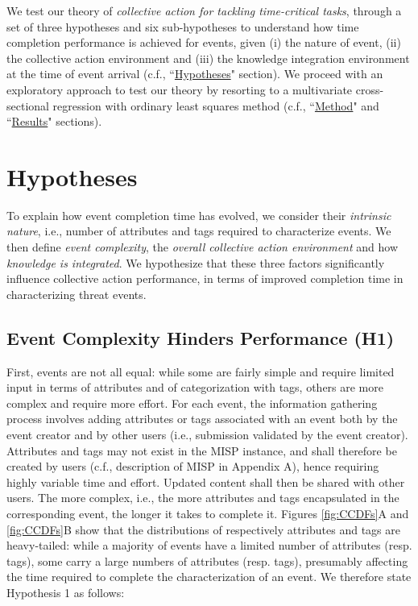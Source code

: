 \documentclass[unnumsec,webpdf,contemporary,large]{oup-authoring-template}%
\theoremstyle{thmstyleone}%
\theoremstyle{thmstyletwo}%
\theoremstyle{thmstylethree}%
\begin{document}
We test our theory of {\it collective action for tackling time-critical tasks}, through a set of three hypotheses and six sub-hypotheses to understand how time completion performance is achieved for events, given (i) the nature of event, (ii) the collective action environment and (iii) the knowledge integration environment at the time of event arrival (c.f., ``\hyperref[sec:hypotheses]{Hypotheses}" section). We proceed with an exploratory approach to test our theory by resorting to a multivariate cross-sectional regression with ordinary least squares method (c.f., ``\hyperref[sec:method]{Method}" and ``\hyperref[sec:results]{Results}" sections).

\section{Hypotheses}
\label{sec:hypotheses}

To explain how event completion time has evolved, we consider their {\it intrinsic nature}, i.e., number of attributes and tags required to characterize events. We then define {\it event complexity}, the {\it overall collective action environment} and how {\it knowledge is integrated}. We hypothesize that these three factors significantly influence collective action performance, in terms of improved completion time in characterizing threat events.


\subsection{Event Complexity Hinders Performance (H1)}

First, events are not all equal: while some are fairly simple and require limited input in terms of attributes and of categorization with tags, others are more complex and require more effort. For each event, the information gathering process involves adding attributes or tags associated with an event both by the event creator and by other users (i.e., submission validated by the event creator). Attributes and tags may not exist in the MISP instance, and shall therefore be created by users (c.f.,  description of MISP in Appendix A), hence requiring highly variable time and effort. Updated content shall then be shared with other users. The more complex, i.e., the more attributes and tags encapsulated in the corresponding event, the longer it takes to complete it. Figures \ref{fig:CCDFs}A and \ref{fig:CCDFs}B show that the distributions of respectively attributes and tags are heavy-tailed: while a majority of events have a limited number of attributes (resp. tags), some carry a large numbers of attributes (resp. tags), presumably affecting the time required to complete the characterization of an event. We therefore state Hypothesis 1 as follows:\\ 
\end{document}
